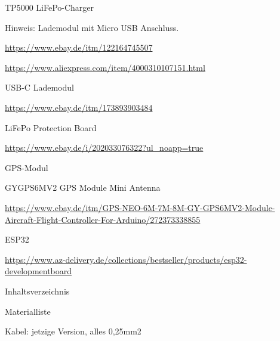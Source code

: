 \documentclass[
]{article}
\begin{document}
{}

{TP5000 LiFePo-Charger}

{Hinweis: Lademodul mit Micro USB Anschluss. }

{\href{https://www.google.com/url?q=https://www.ebay.de/itm/122164745507\&sa=D\&ust=1588976963771000}{https://www.ebay.de/itm/122164745507}}

{\href{https://www.google.com/url?q=https://www.aliexpress.com/item/4000310107151.html\&sa=D\&ust=1588976963771000}{https://www.aliexpress.com/item/4000310107151.html}}

{}

{USB-C Lademodul}

{\href{https://www.google.com/url?q=https://www.ebay.de/itm/173893903484\&sa=D\&ust=1588976963772000}{https://www.ebay.de/itm/173893903484}}

{}

{LiFePo Protection Board}

{\href{https://www.google.com/url?q=https://www.ebay.de/i/202033076322?ul_noapp\%3Dtrue\&sa=D\&ust=1588976963773000}{https://www.ebay.de/i/202033076322?ul\_noapp=true}}

{}

{GPS-Modul}

{GYGPS6MV2 GPS Module Mini Antenna}

{\href{https://www.google.com/url?q=https://www.ebay.de/itm/GPS-NEO-6M-7M-8M-GY-GPS6MV2-Module-Aircraft-Flight-Controller-For-Arduino/272373338855\&sa=D\&ust=1588976963774000}{https://www.ebay.de/itm/GPS-NEO-6M-7M-8M-GY-GPS6MV2-Module-Aircraft-Flight-Controller-For-Arduino/272373338855}}

{}

{}

{ESP32}

{\href{https://www.google.com/url?q=https://www.az-delivery.de/collections/bestseller/products/esp32-developmentboard\&sa=D\&ust=1588976963775000}{https://www.az-delivery.de/collections/bestseller/products/esp32-developmentboard}}

{}

{}

{}

{}

{Inhaltsverzeichnis}

{Materialliste}

{Kabel: jetzige Version, alles 0,25mm}{2}{~}

{}

\protect\hypertarget{t.9a815b74fcc604715e7feb03f2d81a08b49f1f51}{}{}\protect\hypertarget{t.0}{}{}
\end{document}
